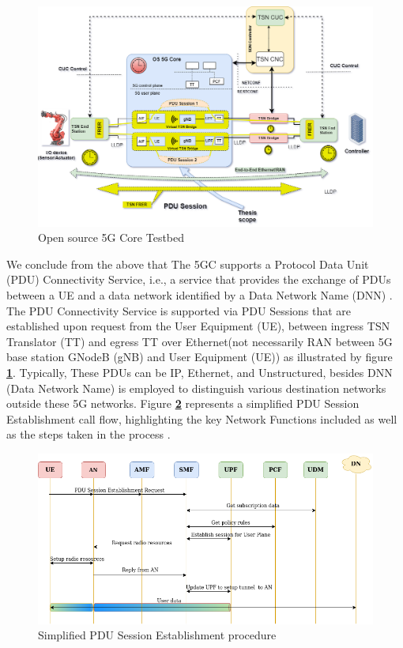  
 \begin{figure}
 
\centering
\includegraphics[scale=0.30]{images/OS-5GC-Main.png}
\caption{Open source 5G Core Testbed\cite{Ericsson2019}}
\label{fig:OS-5GC-Main}
  \end{figure}

 
 
 
 
We conclude from the above that The 5GC supports a Protocol Data Unit (PDU) Connectivity Service, i.e., a service that provides the exchange of PDUs between a UE and a data network identified by a Data Network Name (DNN) \cite{ROMMER2020111}. The PDU Connectivity Service is supported via PDU Sessions that are established upon request from the User Equipment (UE), between ingress TSN Translator (TT) and egress TT over Ethernet(not necessarily RAN between 5G base station GNodeB (gNB)  and User Equipment (UE)) as illustrated by figure \textbf{\ref{fig:OS-5GC-Main}}.
Typically, These PDUs can be IP, Ethernet, and Unstructured, besides DNN (Data Network Name) is employed to distinguish various destination networks outside these 5G networks. Figure \textbf{\ref{fig:Simplified_PDU_Session_Establishment_procedure}} represents a simplified PDU Session Establishment call flow, highlighting the key Network Functions included as well as the steps taken in the process \cite{ROMMER2020111}.

 
\begin{figure}
\centering
\includegraphics[scale=0.40]{images/Simplified_PDU_Session_Establishment_procedure.png} 
\caption{Simplified PDU Session Establishment procedure \cite{ROMMER2020111}}
\label{fig:Simplified_PDU_Session_Establishment_procedure}
 \end{figure}



